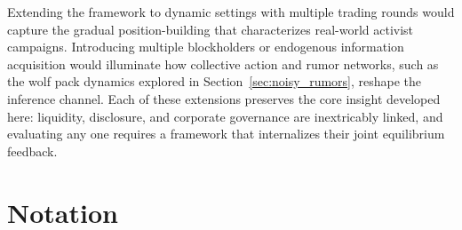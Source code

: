 \documentclass[11pt]{article}
\newcommand{\1}{\mathbf{1}}
\begin{document}
Extending the framework to dynamic settings with multiple trading rounds would capture the gradual position-building that characterizes real-world activist campaigns. Introducing multiple blockholders or endogenous information acquisition would illuminate how collective action and rumor networks, such as the wolf pack dynamics explored in Section~\ref{sec:noisy_rumors}, reshape the inference channel. Each of these extensions preserves the core insight developed here: liquidity, disclosure, and corporate governance are inextricably linked, and evaluating any one requires a framework that internalizes their joint equilibrium feedback.

\clearpage
{\begingroup\sloppy\setlength{\emergencystretch}{2em}\printbibliography\endgroup}

\appendix

\section{Notation}
\label{app:notation}
\end{document}

